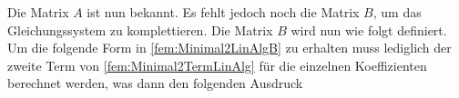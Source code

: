 Die Matrix $A$ ist nun bekannt. Es fehlt jedoch noch die Matrix $B$, um das Gleichungssystem zu komplettieren. Die Matrix $B$ wird nun wie folgt definiert. Um die folgende Form in \eqref{fem:Minimal2LinAlgB} zu erhalten muss lediglich der zweite Term von \eqref{fem:Minimal2TermLinAlg} für die einzelnen Koeffizienten berechnet werden, was dann den folgenden Ausdruck

